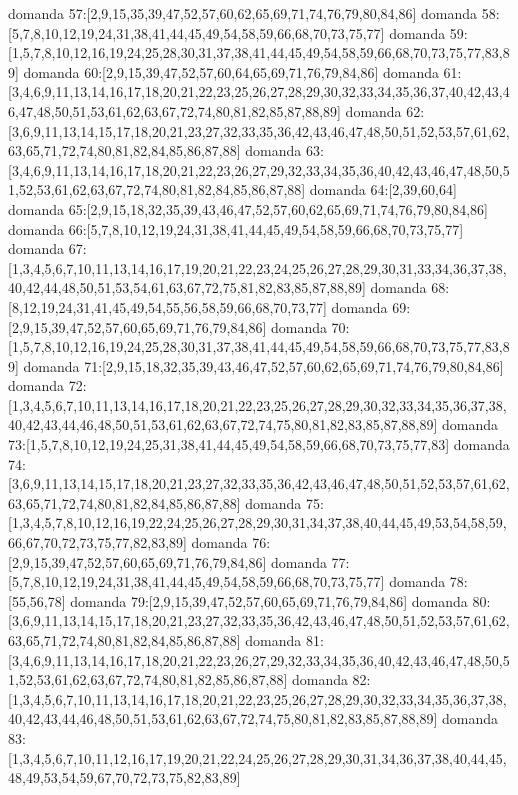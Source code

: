 domanda 57:[2,9,15,35,39,47,52,57,60,62,65,69,71,74,76,79,80,84,86]
domanda 58:[5,7,8,10,12,19,24,31,38,41,44,45,49,54,58,59,66,68,70,73,75,77]
domanda 59:[1,5,7,8,10,12,16,19,24,25,28,30,31,37,38,41,44,45,49,54,58,59,66,68,70,73,75,77,83,89]
domanda 60:[2,9,15,39,47,52,57,60,64,65,69,71,76,79,84,86]
domanda 61:[3,4,6,9,11,13,14,16,17,18,20,21,22,23,25,26,27,28,29,30,32,33,34,35,36,37,40,42,43,46,47,48,50,51,53,61,62,63,67,72,74,80,81,82,85,87,88,89]
domanda 62:[3,6,9,11,13,14,15,17,18,20,21,23,27,32,33,35,36,42,43,46,47,48,50,51,52,53,57,61,62,63,65,71,72,74,80,81,82,84,85,86,87,88]
domanda 63:[3,4,6,9,11,13,14,16,17,18,20,21,22,23,26,27,29,32,33,34,35,36,40,42,43,46,47,48,50,51,52,53,61,62,63,67,72,74,80,81,82,84,85,86,87,88]
domanda 64:[2,39,60,64]
domanda 65:[2,9,15,18,32,35,39,43,46,47,52,57,60,62,65,69,71,74,76,79,80,84,86]
domanda 66:[5,7,8,10,12,19,24,31,38,41,44,45,49,54,58,59,66,68,70,73,75,77]
domanda 67:[1,3,4,5,6,7,10,11,13,14,16,17,19,20,21,22,23,24,25,26,27,28,29,30,31,33,34,36,37,38,40,42,44,48,50,51,53,54,61,63,67,72,75,81,82,83,85,87,88,89]
domanda 68:[8,12,19,24,31,41,45,49,54,55,56,58,59,66,68,70,73,77]
domanda 69:[2,9,15,39,47,52,57,60,65,69,71,76,79,84,86]
domanda 70:[1,5,7,8,10,12,16,19,24,25,28,30,31,37,38,41,44,45,49,54,58,59,66,68,70,73,75,77,83,89]
domanda 71:[2,9,15,18,32,35,39,43,46,47,52,57,60,62,65,69,71,74,76,79,80,84,86]
domanda 72:[1,3,4,5,6,7,10,11,13,14,16,17,18,20,21,22,23,25,26,27,28,29,30,32,33,34,35,36,37,38,40,42,43,44,46,48,50,51,53,61,62,63,67,72,74,75,80,81,82,83,85,87,88,89]
domanda 73:[1,5,7,8,10,12,19,24,25,31,38,41,44,45,49,54,58,59,66,68,70,73,75,77,83]
domanda 74:[3,6,9,11,13,14,15,17,18,20,21,23,27,32,33,35,36,42,43,46,47,48,50,51,52,53,57,61,62,63,65,71,72,74,80,81,82,84,85,86,87,88]
domanda 75:[1,3,4,5,7,8,10,12,16,19,22,24,25,26,27,28,29,30,31,34,37,38,40,44,45,49,53,54,58,59,66,67,70,72,73,75,77,82,83,89]
domanda 76:[2,9,15,39,47,52,57,60,65,69,71,76,79,84,86]
domanda 77:[5,7,8,10,12,19,24,31,38,41,44,45,49,54,58,59,66,68,70,73,75,77]
domanda 78:[55,56,78]
domanda 79:[2,9,15,39,47,52,57,60,65,69,71,76,79,84,86]
domanda 80:[3,6,9,11,13,14,15,17,18,20,21,23,27,32,33,35,36,42,43,46,47,48,50,51,52,53,57,61,62,63,65,71,72,74,80,81,82,84,85,86,87,88]
domanda 81:[3,4,6,9,11,13,14,16,17,18,20,21,22,23,26,27,29,32,33,34,35,36,40,42,43,46,47,48,50,51,52,53,61,62,63,67,72,74,80,81,82,85,86,87,88]
domanda 82:[1,3,4,5,6,7,10,11,13,14,16,17,18,20,21,22,23,25,26,27,28,29,30,32,33,34,35,36,37,38,40,42,43,44,46,48,50,51,53,61,62,63,67,72,74,75,80,81,82,83,85,87,88,89]
domanda 83:[1,3,4,5,6,7,10,11,12,16,17,19,20,21,22,24,25,26,27,28,29,30,31,34,36,37,38,40,44,45,48,49,53,54,59,67,70,72,73,75,82,83,89]

